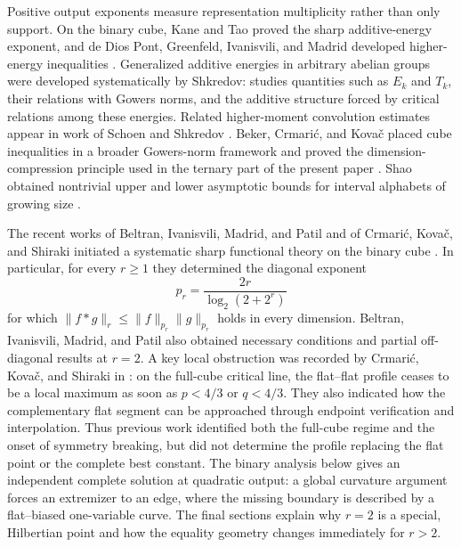 \documentclass[11pt,reqno]{amsart}
\numberwithin{equation}{section}
\theoremstyle{definition}
\theoremstyle{remark}
\begin{document}
Positive output exponents measure representation multiplicity rather than only support.  On the binary cube, Kane and Tao proved the sharp additive-energy exponent, and de Dios Pont, Greenfeld, Ivanisvili, and Madrid developed higher-energy inequalities \cite{KaneTao2017,DGIM}.  Generalized additive energies in arbitrary abelian groups were developed systematically by Shkredov: \cite{Shkredov2014} studies quantities such as $E_k$ and $T_k$, their relations with Gowers norms, and the additive structure forced by critical relations among these energies.  Related higher-moment convolution estimates appear in work of Schoen and Shkredov \cite{SchoenShkredov2013}.  Beker, Crmari\'c, and Kova\v{c} placed cube inequalities in a broader Gowers-norm framework and proved the dimension-compression principle used in the ternary part of the present paper \cite{BekerCK2024}.  Shao obtained nontrivial upper and lower asymptotic bounds for interval alphabets of growing size \cite{Shao2026}.

The recent works of Beltran, Ivanisvili, Madrid, and Patil and of Crmari\'c, Kova\v{c}, and Shiraki initiated a systematic sharp functional theory on the binary cube \cite{BIMP,CKS}.  In particular, for every $r\ge1$ they determined the diagonal exponent
\[
  p_r=\frac{2r}{\log_2(2+2^r)}
\]
for which $\|f*g\|_r\le\|f\|_{p_r}\|g\|_{p_r}$ holds in every dimension.  Beltran, Ivanisvili, Madrid, and Patil also obtained necessary conditions and partial off-diagonal results at $r=2$.  A key local obstruction was recorded by Crmari\'c, Kova\v{c}, and Shiraki in \cite[Remark~15]{CKS}: on the full-cube critical line, the flat--flat profile ceases to be a local maximum as soon as $p<4/3$ or $q<4/3$.  They also indicated how the complementary flat segment can be approached through endpoint verification and interpolation.  Thus previous work identified both the full-cube regime and the onset of symmetry breaking, but did not determine the profile replacing the flat point or the complete best constant.  The binary analysis below gives an independent complete solution at quadratic output: a global curvature argument forces an extremizer to an edge, where the missing boundary is described by a flat--biased one-variable curve.  The final sections explain why $r=2$ is a special, Hilbertian point and how the equality geometry changes immediately for $r>2$.
\end{document}

